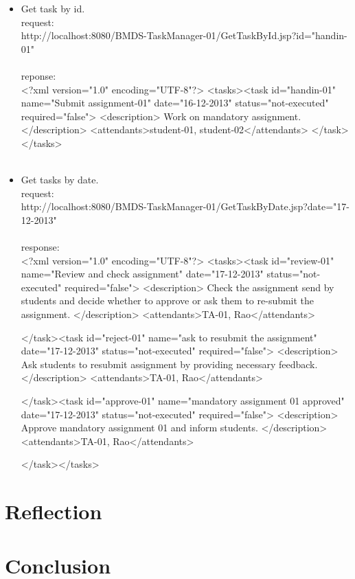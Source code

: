 \documentclass{report}
\begin{document}
\begin{itemize}
		\item
		Get task by id.\\	
		request:\\	
		http://localhost:8080/BMDS-TaskManager-01/GetTaskById.jsp?id="handin-01"\\\\
		
		reponse:\\
		<?xml version="1.0" encoding="UTF-8"?>
		<tasks><task id="handin-01" name="Submit assignment-01" date="16-12-2013" status="not-executed" required="false">
					<description>
						Work on mandatory assignment.
					</description>
					<attendants>student-01, student-02</attendants>
				</task></tasks>
		\\\\
		
		\item
		Get tasks by date.\\
		request:\\
		http://localhost:8080/BMDS-TaskManager-01/GetTaskByDate.jsp?date="17-12-2013"\\\\
		
		response:\\
		<?xml version="1.0" encoding="UTF-8"?>
		<tasks><task id="review-01" name="Review and check assignment" date="17-12-2013" status="not-executed" required="false">
					<description>
						Check the assignment send by students and decide whether
						to approve or
						ask them to re-submit the assignment.
					</description>
					<attendants>TA-01, Rao</attendants>
		
				</task><task id="reject-01" name="ask to resubmit the assignment" date="17-12-2013" status="not-executed" required="false">
					<description>
						Ask students to resubmit assignment by providing
						necessary feedback.
					</description>
					<attendants>TA-01, Rao</attendants>
		
				</task><task id="approve-01" name="mandatory assignment 01 approved" date="17-12-2013" status="not-executed" required="false">
					<description>
						Approve mandatory assignment 01 and inform students.
					</description>
					<attendants>TA-01, Rao</attendants>
		
				</task></tasks>
		\end{itemize}
	\section{Reflection}
	\label{servlet_reflection}
		
	\section{Conclusion}
	\label{servlet_conclusion}
	
\end{document}
